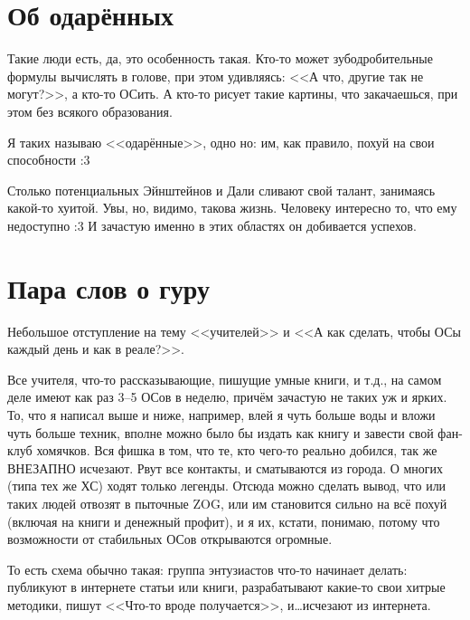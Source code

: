 \documentclass[a5paper,12pt,twoside]{memoir}
\begin{document}
\section{Об одарённых}

\medskip
Такие люди есть, да, это особенность такая. Кто-то может зубодробительные формулы вычислять в голове, при этом удивляясь: <<А что, другие так не могут?>>, а кто-то ОСить. 
А кто-то рисует такие картины, что закачаешься, при этом без всякого образования. 

Я таких называю <<одарённые>>, одно но: им, как правило, похуй на свои способности :3
 
Столько потенциальных Эйнштейнов и Дали сливают свой талант, занимаясь какой-то хуитой. Увы, но, видимо, такова жизнь. Человеку интересно то, что ему недоступно :3 И зачастую именно в этих областях он добивается успехов.




\section{Пара слов о гуру}
Небольшое отступление на тему <<учителей>> и <<А как сделать, чтобы ОСы каждый день и как в реале?>>.

Все учителя, что-то рассказывающие, пишущие умные книги, и т.д., на самом деле имеют как раз 3--5 ОСов в неделю, причём зачастую не таких уж и ярких. То, что я написал выше и ниже, например, влей я чуть больше воды и вложи чуть больше техник, вполне можно было бы издать как книгу и завести свой фан-клуб хомячков. Вся фишка в том, что те, кто чего-то реально добился, так же ВНЕЗАПНО исчезают. Рвут все контакты, и сматываются из города. О многих (типа тех же ХС) ходят только легенды. Отсюда можно сделать вывод, что или таких людей отвозят в пыточные ZOG, или им становится сильно на всё похуй (включая на книги и денежный профит), и я их, кстати, понимаю, потому что возможности от стабильных ОСов открываются огромные.

То есть схема обычно такая: группа энтузиастов что-то начинает делать: публикуют в интернете статьи или книги, разрабатывают какие-то свои хитрые методики, пишут <<Что-то вроде получается>>, и\ldots ис\-че\-за\-ют из интернета.
\end{document}

